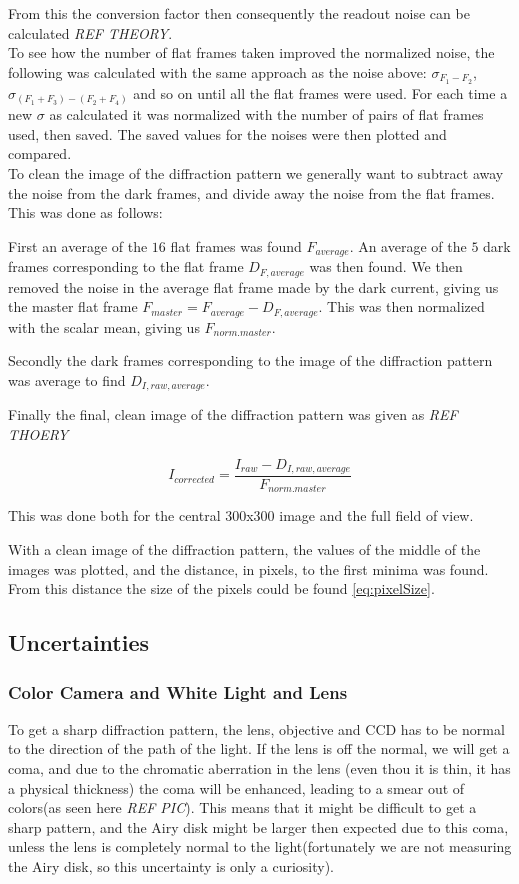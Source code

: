 \documentclass{emulateapj}
\begin{document}
From this the conversion factor then consequently the readout noise can be calculated \emph{REF THEORY}.\\

To see how the number of flat frames taken improved the normalized noise, the following was calculated with the same approach as the noise above:
$\sigma_{F_1-F_2}$, $\sigma_{(F_1 + F_3) - (F_2+F_4)}$ and so on until all the flat frames were used. For each time a new $\sigma$ as calculated it was normalized with the number of pairs of flat frames used, then saved. The saved values for the noises were then plotted and compared.\\

To clean the image of the diffraction pattern we generally want to subtract away the noise from the dark frames, and divide away the noise from the flat frames. This was done as follows:

First an average of the $16$ flat frames was found $F_{average}$. An average of the $5$ dark frames corresponding to the flat frame $D_{F,average}$ was then found. We then removed the noise in the average flat frame made by the dark current, giving us the master flat frame $F_{master} = F_{average}-D_{F,average}$. This was then normalized with the scalar mean, giving us $F_{norm. master}$.

Secondly the dark frames corresponding to the image of the diffraction pattern was average to find $D_{I,raw,average}$. 

Finally the final, clean image of the diffraction pattern was given as \emph{REF THOERY}

\begin{equation}
I_{corrected} = \frac{I_{raw} - D_{I,raw,average}}{F_{norm. master}}
\end{equation}

This was done both for the central 300x300 image and the full field of view.

With a clean image of the diffraction pattern, the values of the middle of the images was plotted, and the distance, in pixels, to the first minima was found. From this distance the size of the pixels could be found \eqref{eq:pixelSize}. 

\subsection{Uncertainties}

\subsubsection{Color Camera and White Light and Lens}
To get a sharp diffraction pattern, the lens, objective and CCD has to be normal to the direction of the path of the light. If the lens is off the normal, we will get a coma, and due to the chromatic aberration in the lens (even thou it is thin, it has a physical thickness) the coma will be enhanced, leading to a smear out of colors(as seen here \emph{REF PIC}). This means that it might be difficult to get a sharp pattern, and the Airy disk might be larger then expected due to this coma, unless the lens is completely normal to the light(fortunately we are not measuring the Airy disk, so this uncertainty is only a curiosity).
\end{document}
